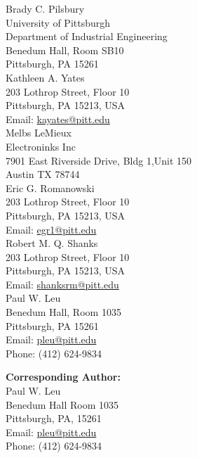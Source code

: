 \documentclass[12pt]{letter}
\begin{document}
Brady C. Pilsbury \\
University of Pittsburgh \\
Department of Industrial Engineering \\
Benedum Hall, Room SB10 \\
Pittsburgh, PA 15261\\

Kathleen A. Yates\\
 203 Lothrop Street, Floor 10\\
Pittsburgh, PA 15213, USA\\
Email:  \href{mailto:kayates@pitt.edu}{kayates@pitt.edu}\\

Melbs LeMieux \\
Electroninks Inc \\ 
7901 East Riverside Drive, Bldg 1,Unit 150\\
Austin TX  78744 \\

Eric G. Romanowski\\
 203 Lothrop Street, Floor 10\\
Pittsburgh, PA 15213, USA\\
Email:  \href{mailto:egr1@pitt.edu}{egr1@pitt.edu}\\

Robert M. Q. Shanks\\
 203 Lothrop Street, Floor 10\\
Pittsburgh, PA 15213, USA\\
Email:  \href{mailto:shanksrm@pitt.edu}{shanksrm@pitt.edu}\\

Paul W. Leu\\
Benedum Hall, Room 1035 \\
Pittsburgh, PA 15261\\
Email:  \href{mailto:pleu@pitt.edu}{pleu@pitt.edu}\\
Phone: (412) 624-9834

\textbf{Corresponding Author:}\\
Paul W. Leu\\
Benedum Hall Room 1035 \\
Pittsburgh, PA, 15261\\
Email:  \href{mailto:pleu@pitt.edu}{pleu@pitt.edu}\\
Phone: (412) 624-9834





%
%
\end{document}
